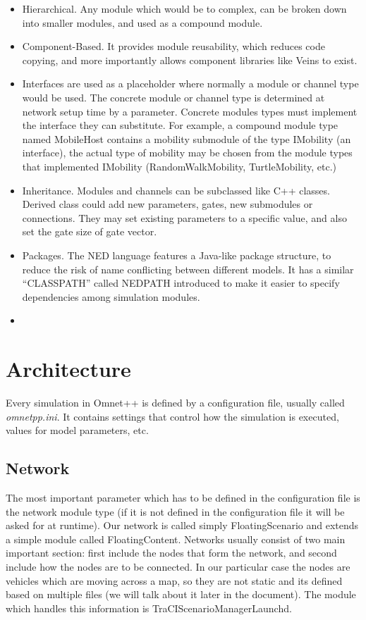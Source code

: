 \begin{itemize}
  \item Hierarchical. Any module which would be to complex, can be broken down
  into smaller modules, and used as a compound module.
  \item Component-Based. It provides module reusability, which reduces code
  copying, and more importantly allows component libraries like Veins to exist.
  \item Interfaces are used as a placeholder where normally a module or channel
  type would be used. The concrete module or channel type is determined at
  network setup time by a parameter. Concrete modules types must implement the
  interface they can substitute. For example, a compound module type named
  MobileHost contains a mobility submodule of the type IMobility (an interface),
  the actual type of mobility may be chosen from the module types that
  implemented IMobility (RandomWalkMobility, TurtleMobility, etc.)
  \item Inheritance. Modules and channels can be subclassed like C++ classes.
  Derived class could add new parameters, gates, new submodules or connections.
  They may set existing parameters to a specific value, and also set the gate
  size of gate vector.
  \item Packages. The NED language features a Java-like package structure, to
  reduce the risk of name conflicting between different models. It has a similar
  ``CLASSPATH'' called NEDPATH introduced to make it easier to specify
  dependencies among simulation modules.
  \item 
\end{itemize}

\section{Architecture}
Every simulation in Omnet++ is defined by a configuration file, usually called
{\it omnetpp.ini}. It contains settings that control how the simulation is
executed, values for model parameters, etc.

\subsection{Network}
The most important parameter which has to be defined in the configuration file
is the network module type (if it is not defined in the configuration file it
will be asked for at runtime). Our network is called simply FloatingScenario and
extends a simple module called FloatingContent. Networks usually consist
of two main important section: first include the nodes that form the network,
and second include how the nodes are to be connected. In our particular case the
nodes are vehicles which are moving across a map, so they are not static and its
defined based on multiple files (we will talk about it later in the document).
The module which handles this information is TraCIScenarioManagerLaunchd.

